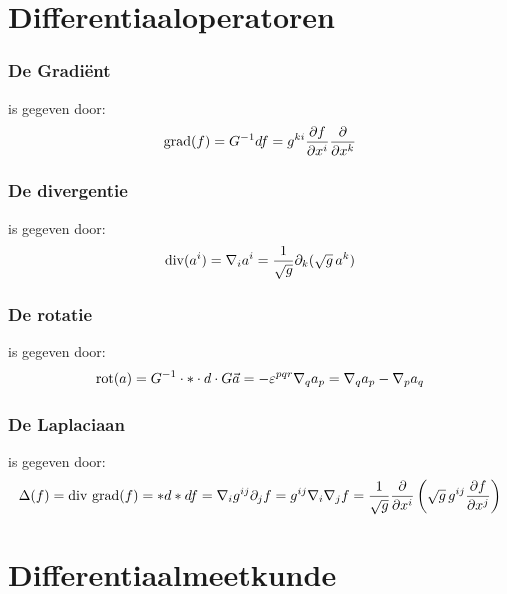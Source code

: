 \documentclass[twoside]{report}
\begin{document}
\section{Differentiaaloperatoren}
\subsubsection{De Gradi\"ent}
is gegeven door:
\[
{\rm grad}(f)=G^{-1}df=g^{ki}\frac{\partial f}{\partial x^i}\frac{\partial }{\partial x^k}
\]

\subsubsection{De divergentie}
is gegeven door:
\[
{\rm div}(a^i)=\nabla_ia^i=\frac{1}{\sqrt{g}}\partial_k(\sqrt{g}\,a^k)
\]

\subsubsection{De rotatie}
is gegeven door:
\[
{\rm rot}(a)=G^{-1}\cdot*\cdot d\cdot G\vec{a}=-\varepsilon^{pqr}\nabla_qa_p=\nabla_qa_p-\nabla_pa_q
\]

\subsubsection{De Laplaciaan}
is gegeven door:
\[
\Delta(f)={\rm div~grad}(f)=*d*df=\nabla_ig^{ij}\partial_jf=g^{ij}\nabla_i\nabla_jf=
\frac{1}{\sqrt{g}}\frac{\partial}{\partial x^i}\left(\sqrt{g}\,g^{ij}\frac{\partial f}{\partial x^j}\right)
\]

\section{Differentiaalmeetkunde}
\end{document}
